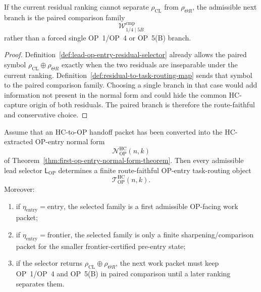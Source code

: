 \begin{proposition}
\label{prop:paired-comparison-branch-safe-non-dominant-branch}
If the current residual ranking cannot separate $\rho_{\mathrm{CL}}$ from $\rho_{\Theta R}$, the admissible next branch is the paired comparison family
\[
  \mathcal W_{1/4\mid 5B}^{\mathrm{cmp}}
\]
rather than a forced single OP~1/OP~4 or OP~5(B) branch.
\end{proposition}

\begin{proof}
Definition~\ref{def:lead-op-entry-residual-selector} already allows the paired symbol $\rho_{\mathrm{CL}}\oplus\rho_{\Theta R}$ exactly when the two residuals are inseparable under the current ranking.  Definition~\ref{def:residual-to-task-routing-map} sends that symbol to the paired comparison family.  Choosing a single branch in that case would add information not present in the normal form and could hide the common HC-capture origin of both residuals.  The paired branch is therefore the route-faithful and conservative choice.
\end{proof}

\begin{theorem}
\label{thm:first-op-entry-task-routing-theorem}
Assume that an HC-to-OP handoff packet has been converted into the HC-extracted OP-entry normal form
\[
  \mathcal N_{\mathrm{OP}}^{\mathrm{HC}}(n,k)
\]
of Theorem~\ref{thm:first-op-entry-normal-form-theorem}.  Then every admissible lead selector $\mathsf L_{\mathrm{OP}}$ determines a finite route-faithful OP-entry task-routing object
\[
  \mathcal T_{\mathrm{OP}}^{\mathrm{HC}}(n,k).
\]
Moreover:
\begin{enumerate}[leftmargin=2em,label=(\roman*)]
  \item if $\eta_{\mathrm{entry}}=\mathrm{entry}$, the selected family is a first admissible OP-facing work packet;
  \item if $\eta_{\mathrm{entry}}=\mathrm{frontier}$, the selected family is only a finite sharpening/comparison packet for the smaller frontier-certified pre-entry state;
  \item if the selector returns $\rho_{\mathrm{CL}}\oplus\rho_{\Theta R}$, the next work packet must keep OP~1/OP~4 and OP~5(B) in paired comparison until a later ranking separates them.
\end{enumerate}
\end{theorem}


